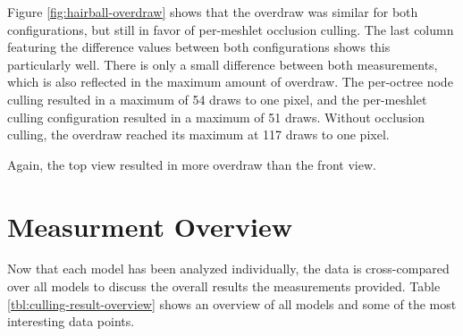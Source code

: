 \noindent
Figure \ref{fig:hairball-overdraw} shows that the overdraw was similar for both configurations, 
but still in favor of per-meshlet occlusion culling. The last column featuring the difference 
values between both configurations shows this particularly well. There is only a small difference 
between both measurements, which is also reflected in the maximum amount of overdraw. The 
per-octree node culling resulted in a maximum of 54 draws to one pixel, and the per-meshlet 
culling configuration resulted in a maximum of 51 draws. Without occlusion culling, the overdraw 
reached its maximum at 117 draws to one pixel. 

Again, the top view resulted in more 
overdraw than the front view.

\clearpage




\section*{Measurment Overview}

Now that each model has been analyzed individually, the data is cross-compared over all models to 
discuss the overall results the measurements provided. Table \ref{tbl:culling-result-overview} shows 
an overview of all models and some of the most interesting data points. 
  

